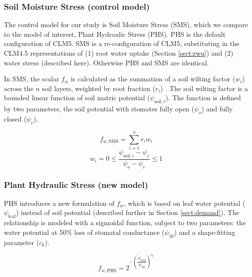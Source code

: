 \documentclass[draft,linenumbers]{agujournal}
\begin{document}
    \subsubsection{Soil Moisture Stress (control model)}
    \label{sect:fwsms}
    
    The control model for our study is Soil Moisture Stress (SMS), which we compare to the model of interest, Plant Hydraulic Stress (PHS). 
    PHS is the default configuration of CLM5.
    SMS is a re-configuration of CLM5, substituting in the CLM4.5 representations of 
    (1) root water uptake (Section \ref{sect:rwu}) and (2) water stress (described here).
    Otherwise PHS and SMS are identical.
    
    In SMS, the scalar $f_w$ is calculated as the summation of a soil wilting factor ($w_i$) across the $n$ soil layers, weighted by root fraction ($r_i$) \citep{oleson2013}.
    The soil wilting factor is a bounded linear function of soil matric potential ($\psi_{\text{soil},i}$).
    The function is defined by two parameters, the soil potential with stomates fully open ($\psi_o$) and fully closed ($\psi_c$).  

    \begin{linenomath*}
    \begin{equation}
     f_{w,\text{SMS}} = \sum_{i=1}^{n}{r_iw_i}
    \label{bt:1}
    \end{equation}
    \begin{equation} 
    \label{bt:2}
    w_i=0 \leq \dfrac{\psi_{\text{soil},i}-\psi_{c}}{\psi_{o}-\psi_{c}} \leq 1
    \end{equation}
    \end{linenomath*}
    
    \subsubsection{Plant Hydraulic Stress (new model)}
    
    PHS introduces a new formulation of $f_w$, which is based on leaf water potential ($\psi_{\text{leaf}}$) instead of soil potential (described further in Section \ref{sect:demand}).
    The relationship is modeled with a sigmoidal function, subject to two parameters: the water potential at 50\% loss of stomatal conductance ($\psi_{50}$) and a shape-fitting parameter ($c_k$).
    
    \begin{linenomath*}
    \begin{equation}
    f_{w,\text{PHS}} = 2^{-\left(\dfrac{\psi_{\text{leaf}}}{\psi_{50}}\right)^{c_k}}
    \end{equation}
    \end{linenomath*}
    
\end{document}
